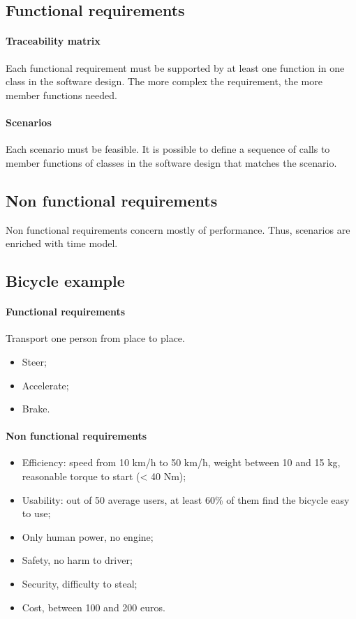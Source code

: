 \subsection{Functional requirements}
\paragraph{Traceability matrix}
Each functional requirement must be supported by at least one function in one class in the software design. The more complex the requirement, the more member functions needed.

\paragraph{Scenarios}
Each scenario must be feasible. It is possible to define a sequence of calls to member functions of classes in the software design that matches the scenario.

\subsection{Non functional requirements}
Non functional requirements concern mostly of performance. Thus, scenarios are enriched with time model.

\newpage

\subsection*{Bicycle example}
\paragraph{Functional requirements}
Transport one person from place to place.
\begin{itemize}
\item Steer;
\item Accelerate;
\item Brake.
\end{itemize}

\paragraph{Non functional requirements}
\begin{itemize}
\item Efficiency: speed from 10 km/h to 50 km/h, weight between 10 and 15 kg, reasonable torque to start (< 40 Nm);
\item Usability: out of 50 average users, at least 60\% of them find the bicycle easy to use;
\item Only human power, no engine;
\item Safety, no harm to driver;
\item Security, difficulty to steal;
\item Cost, between 100 and 200 euros.
\end{itemize}

